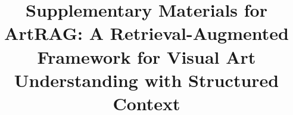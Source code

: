 \documentclass[sigconf,screen, review,anonymous]{acmart}
\begin{document}
\title{Supplementary Materials for ArtRAG: A Retrieval-Augmented Framework for Visual Art Understanding with Structured Context }













\end{document}
